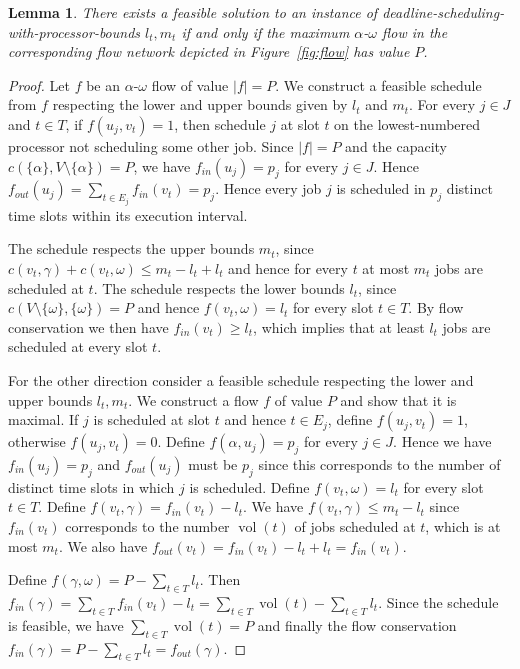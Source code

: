 \documentclass[a4paper]{article}
\DeclareMathOperator{\vol}{vol}
\newtheorem{lemma}[theorem]{Lemma}
\begin{document}
\begin{lemma}\label{lemma:flow_feasibility}
  There exists a feasible solution to an instance of deadline-scheduling-with-processor-bounds $l_t, m_t$ if and only if the maximum $\alpha$-$\omega$ flow in the corresponding flow network depicted in Figure~\ref{fig:flow} has value $P$.
\end{lemma}
\begin{proof}
  Let $f$ be an $\alpha$-$\omega$ flow of value $|f| = P$.
  We construct a feasible schedule from $f$ respecting the lower and upper bounds given by $l_t$ and $m_t$.
  For every $j \in J$ and  $t \in T$, if $f(u_j, v_t) = 1$, then schedule $j$ at slot $t$ on the lowest-numbered processor not scheduling some other job.
  Since $|f| = P$ and the capacity $c(\{\alpha\}, V \setminus \{\alpha\}) = P$, we have $f_{in}(u_j) = p_j$ for every $j \in J$.
  Hence $f_{out}(u_j) = \sum_{t \in E_j} f_{in}(v_t) = p_j$.
  Hence every job $j$ is scheduled in $p_j$ distinct time slots within its execution interval.

  The schedule respects the upper bounds $m_t$, since $c(v_t, \gamma) + c(v_t, \omega) \leq m_t - l_t + l_t$ and hence for every $t$ at most $m_t$ jobs are scheduled at $t$.
  The schedule respects the lower bounds $l_t$, since
  $c(V \setminus \{\omega\}, \{\omega\}) = P$ and hence
  $f(v_t, \omega) = l_t$ for every slot $t \in T$.
  By flow conservation we then have $f_{in}(v_t) \geq l_t$, which implies that at least $l_t$ jobs are scheduled at every slot $t$.

  For the other direction consider a feasible schedule respecting the lower and upper bounds $l_t, m_t$.
  We construct a flow $f$ of value $P$ and show that it is maximal.
  If $j$ is scheduled at slot $t$ and hence $t \in E_j$,
  define $f(u_j, v_t) = 1$, otherwise $f(u_j, v_t) = 0$.
  Define $f(\alpha, u_j) = p_j$ for every $j \in J$.
  Hence we have $f_{in}(u_j) = p_j$
  and $f_{out}(u_j)$ must be  $p_j$ since this corresponds to the number of distinct time slots in which $j$ is scheduled.
  Define $f(v_t, \omega) = l_t$ for every slot $t \in T$.
  Define $f(v_t, \gamma) = f_{in}(v_t) - l_t$.
  We have $f(v_t, \gamma) \leq m_t - l_t$ since $f_{in}(v_t)$ corresponds to the number $\vol(t)$ of jobs scheduled at $t$, which is at most $m_t$.
  We also have $f_{out}(v_t) = f_{in}(v_t) - l_t + l_t = f_{in}(v_t)$.

  Define $f(\gamma, \omega) = P - \sum_{t \in T} l_t$.
  Then $f_{in}(\gamma) = \sum_{t \in T} f_{in}(v_t) - l_t
  = \sum_{t \in T} \vol(t) - \sum_{t \in T} l_t$.
  Since the schedule is feasible, we have $\sum_{t \in T} \vol(t) = P$ and finally the flow conservation $f_{in}(\gamma) = P - \sum_{t \in T} l_t = f_{out}(\gamma)$.

\end{proof}
\end{document}
